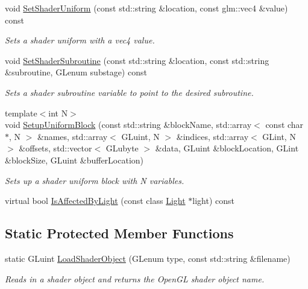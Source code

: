 \begin{DoxyCompactItemize}
void \hyperlink{class_shader_program_a5138c3a38a576bbb90d37ab8be6395bf}{Set\+Shader\+Uniform} (const std\+::string \&location, const glm\+::vec4 \&value) const
\begin{DoxyCompactList}\small\item\em Sets a shader uniform with a vec4 value. \end{DoxyCompactList}\item 
void \hyperlink{class_shader_program_a00815a3efc74c4ff9a12f2a0c9b46d6e}{Set\+Shader\+Subroutine} (const std\+::string \&location, const std\+::string \&subroutine, G\+Lenum substage) const
\begin{DoxyCompactList}\small\item\em Sets a shader subroutine variable to point to the desired subroutine. \end{DoxyCompactList}\item 
{\footnotesize template$<$int N$>$ }\\void \hyperlink{class_shader_program_aac2a462281a872df0ed8d197ec0b4104}{Setup\+Uniform\+Block} (const std\+::string \&block\+Name, std\+::array$<$ const char $\ast$, N $>$ \&names, std\+::array$<$ G\+Luint, N $>$ \&indices, std\+::array$<$ G\+Lint, N $>$ \&offsets, std\+::vector$<$ G\+Lubyte $>$ \&data, G\+Luint \&block\+Location, G\+Lint \&block\+Size, G\+Luint \&buffer\+Location)
\begin{DoxyCompactList}\small\item\em Sets up a shader uniform block with N variables. \end{DoxyCompactList}\item 
virtual bool \hyperlink{class_shader_program_a20b5ed7b5f81154025eb7b6f1be70f84}{Is\+Affected\+By\+Light} (const class \hyperlink{class_light}{Light} $\ast$light) const
\end{DoxyCompactItemize}
\subsection*{Static Protected Member Functions}
\begin{DoxyCompactItemize}
\item 
static G\+Luint \hyperlink{class_shader_program_ab5c50c33203cf65b7f6ffe00d2243d5a}{Load\+Shader\+Object} (G\+Lenum type, const std\+::string \&filename)
\begin{DoxyCompactList}\small\item\em Reads in a shader object and returns the Open\+GL shader object name. \end{DoxyCompactList}\end{DoxyCompactItemize}
